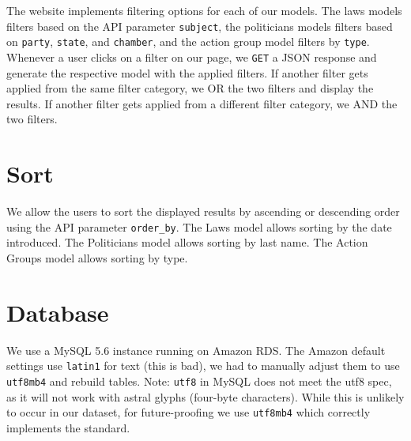 \documentclass[12pt]{article}
\newcommand{\code}[1]{\texttt{#1}}
\begin{document}
The website implements filtering options for each of our models. The laws models filters based on the API parameter \code{subject}, the politicians models filters based on \code{party}, \code{state}, and \code{chamber}, and the action group model filters by \code{type}. Whenever a user clicks on a filter on our page, we \code{GET} a JSON response and generate the respective model with the applied filters. If another filter gets applied from the same filter category, we OR the two filters and display the results. If another filter gets applied from a different filter category, we AND the two filters. 

\section{Sort}

We allow the users to sort the displayed results by ascending or descending order using the API parameter \code{order\_by}. The Laws model allows sorting by the date introduced. The Politicians model allows sorting by last name. The Action Groups model allows sorting by type.

\section{Database}

We use a MySQL 5.6 instance running on Amazon RDS. The Amazon default settings use \code{latin1} for text (this is bad), we had to manually adjust them to use \code{utf8mb4} and rebuild tables. Note: \code{utf8} in MySQL does not meet the utf8 spec, as it will not work with astral glyphs (four-byte characters). While this is unlikely to occur in our dataset, for future-proofing we use \code{utf8mb4} which correctly implements the standard. \\
\end{document}
